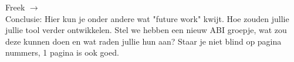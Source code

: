 
\begin{tcolorbox}[colback=yellow!30]
Freek $\rightarrow$ \\
 Conclusie: Hier kun je onder andere wat "future work" kwijt. Hoe zouden jullie jullie tool verder ontwikkelen. Stel we hebben een nieuw ABI groepje, wat zou deze kunnen doen en wat raden jullie hun aan? Staar je niet blind op pagina nummers, 1 pagina is ook goed.
\end{tcolorbox}


